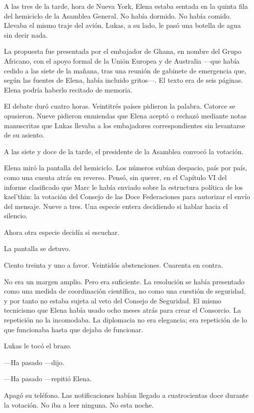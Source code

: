 \documentclass[11pt,a5paper,twoside]{book}
\begin{document}
A las tres de la tarde, hora de Nueva York, Elena estaba sentada en la quinta fila del hemiciclo de la Asamblea General. No había dormido. No había comido. Llevaba el mismo traje del avión. Lukas, a su lado, le pasó una botella de agua sin decir nada.

La propuesta fue presentada por el embajador de Ghana, en nombre del Grupo Africano, con el apoyo formal de la Unión Europea y de Australia —que había cedido a las siete de la mañana, tras una reunión de gabinete de emergencia que, según las fuentes de Elena, había incluido gritos—. El texto era de seis páginas. Elena podría haberlo recitado de memoria.

El debate duró cuatro horas. Veintitrés países pidieron la palabra. Catorce se opusieron. Nueve pidieron enmiendas que Elena aceptó o rechazó mediante notas manuscritas que Lukas llevaba a los embajadores correspondientes sin levantarse de su asiento.

A las siete y doce de la tarde, el presidente de la Asamblea convocó la votación.

Elena miró la pantalla del hemiciclo. Los números subían despacio, país por país, como una cuenta atrás en reverso. Pensó, sin querer, en el Capítulo VI del informe clasificado que Marc le había enviado sobre la estructura política de los kael'thin: la votación del Consejo de las Doce Federaciones para autorizar el envío del mensaje. Nueve a tres. Una especie entera decidiendo si hablar hacia el silencio.

Ahora otra especie decidía si escuchar.

La pantalla se detuvo.

Ciento treinta y uno a favor. Veintidós abstenciones. Cuarenta en contra.

No era un margen amplio. Pero era suficiente. La resolución se había presentado como una medida de coordinación científica, no como una cuestión de seguridad, y por tanto no estaba sujeta al veto del Consejo de Seguridad. El mismo tecnicismo que Elena había usado ocho meses atrás para crear el Consorcio. La repetición no la incomodaba. La diplomacia no era elegancia; era repetición de lo que funcionaba hasta que dejaba de funcionar.

Lukas le tocó el brazo.

—Ha pasado —dijo.

—Ha pasado —repitió Elena.

Apagó su teléfono. Las notificaciones habían llegado a cuatrocientas doce durante la votación. No iba a leer ninguna. No esta noche.
\end{document}
